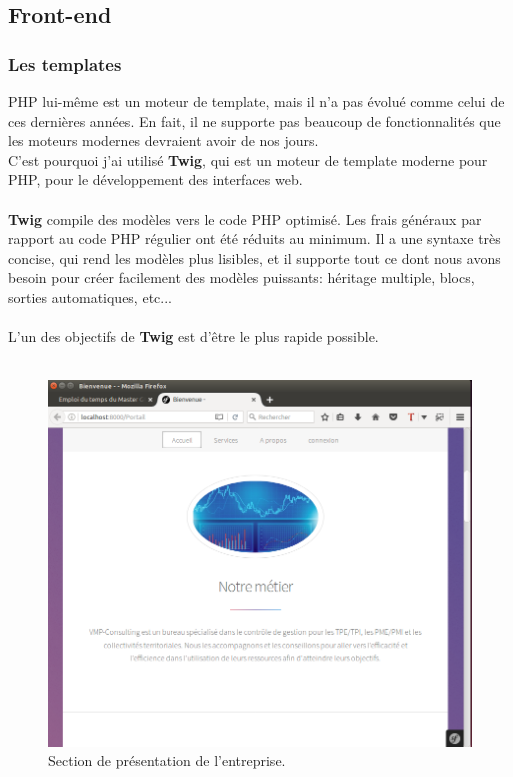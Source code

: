 \documentclass[12pt]{article}
\begin{document}
\subsection{Front-end}

\subsubsection{Les templates}
PHP lui-même est un moteur de template, mais  il n'a pas évolué comme celui de ces dernières années. En fait, il ne supporte pas beaucoup de fonctionnalités que les moteurs modernes devraient avoir de nos jours.\\
C'est pourquoi j'ai utilisé \textbf{Twig}, qui est 
un moteur de template moderne pour PHP, pour le développement des interfaces web.\\ \\

\textbf{Twig} compile des modèles vers le code PHP optimisé. Les frais généraux par rapport au code PHP régulier ont été réduits au minimum. Il  a une syntaxe très concise, qui rend les modèles plus lisibles, et il supporte tout ce dont nous avons besoin pour créer facilement des modèles puissants: héritage multiple, blocs, sorties automatiques, etc...\\ \\

L'un des objectifs de \textbf{Twig} est d'être le plus rapide possible.\\\\


\begin{center}
\begin{figure}[htp]
  \centering
  \includegraphics[width=12cm]{v2.png}
  \caption{Section de présentation de l'entreprise.}
  \label{fig:une-autre-image}
\end{figure}
\end{center}
\end{document}
